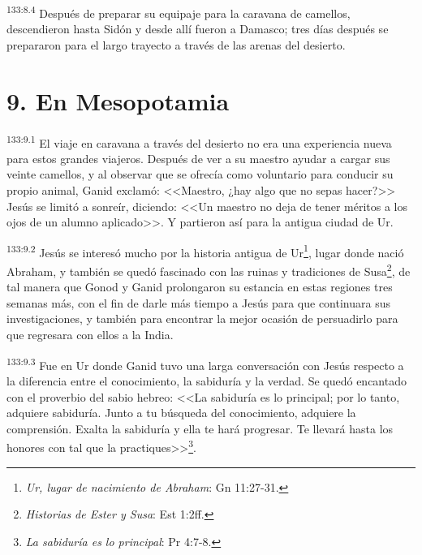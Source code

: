 \par 
\textsuperscript{133:8.4} Después de preparar su equipaje para la caravana de camellos, descendieron hasta Sidón y desde allí fueron a Damasco; tres días después se prepararon para el largo trayecto a través de las arenas del desierto.

\section*{9. En Mesopotamia}
\par 
\textsuperscript{133:9.1} El viaje en caravana a través del desierto no era una experiencia nueva para estos grandes viajeros. Después de ver a su maestro ayudar a cargar sus veinte camellos, y al observar que se ofrecía como voluntario para conducir su propio animal, Ganid exclamó: <<Maestro, ¿hay algo que no sepas hacer?>> Jesús se limitó a sonreír, diciendo: <<Un maestro no deja de tener méritos a los ojos de un alumno aplicado>>. Y partieron así para la antigua ciudad de Ur.

\par 
\textsuperscript{133:9.2} Jesús se interesó mucho por la historia antigua de Ur\footnote{\textit{Ur, lugar de nacimiento de Abraham}: Gn 11:27-31.}, lugar donde nació Abraham, y también se quedó fascinado con las ruinas y tradiciones de Susa\footnote{\textit{Historias de Ester y Susa}: Est 1:2ff.}, de tal manera que Gonod y Ganid prolongaron su estancia en estas regiones tres semanas más, con el fin de darle más tiempo a Jesús para que continuara sus investigaciones, y también para encontrar la mejor ocasión de persuadirlo para que regresara con ellos a la India.

\par 
\textsuperscript{133:9.3} Fue en Ur donde Ganid tuvo una larga conversación con Jesús respecto a la diferencia entre el conocimiento, la sabiduría y la verdad. Se quedó encantado con el proverbio del sabio hebreo: <<La sabiduría es lo principal; por lo tanto, adquiere sabiduría. Junto a tu búsqueda del conocimiento, adquiere la comprensión. Exalta la sabiduría y ella te hará progresar. Te llevará hasta los honores con tal que la practiques>>\footnote{\textit{La sabiduría es lo principal}: Pr 4:7-8.}.


